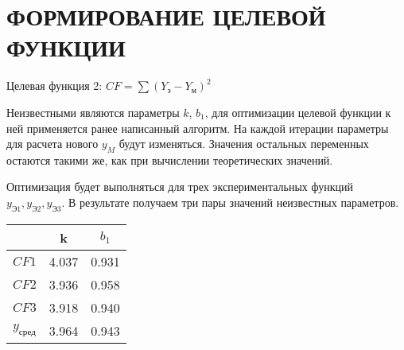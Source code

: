 \part{ФОРМИРОВАНИЕ ЦЕЛЕВОЙ ФУНКЦИИ}
    \begin{center}
        Целевая функция 2: $CF=\sum(Y_{\text{э}} - Y_{\text{м}})^2$
    \end{center}

    Неизвестными являются параметры $k$, $b_1$, для оптимизации целевой функции к ней применяется ранее написанный алгоритм. На каждой итерации параметры для расчета нового $y_M$ будут изменяться. Значения остальных переменных остаются такими же, как при вычислении теоретических значений.

    Оптимизация будет выполняться для трех экспериментальных функций $y_{\text{Э1}}, y_{\text{Э2}}, y_{\text{Э3}}$. В результате получаем три пары значений неизвестных параметров.

    \begin{center}
        \begin{tabular}{c|c|c|}
        \cline{2-3}
                                    & k    & $b_1$  \\ \hline
        \multicolumn{1}{|c|}{$CF1$} & 4.037 & 0.931 \\ \hline
        \multicolumn{1}{|c|}{$CF2$} & 3.936 & 0.958 \\ \hline
        \multicolumn{1}{|c|}{$CF3$} & 3.918 & 0.940  \\ \hline
        \multicolumn{1}{|c|}{$y_{\text{сред}}$} & 3.964  & 0.943   \\ \hline
        \end{tabular}
    \end{center}

    \begin{center}
    \end{center}

